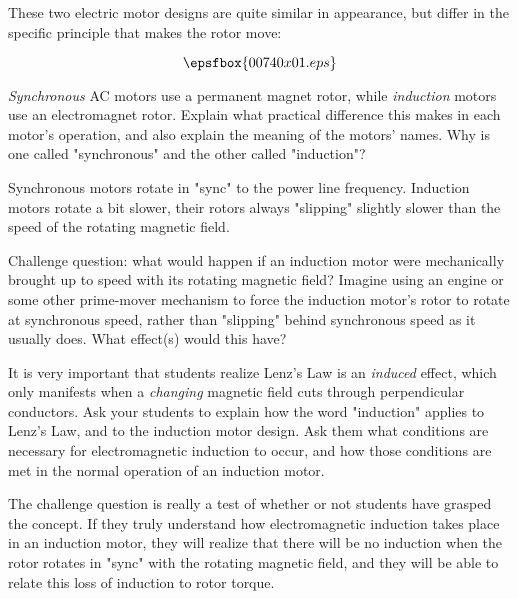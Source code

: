 

These two electric motor designs are quite similar in appearance, but differ in the specific principle that makes the rotor move:

$$\epsfbox{00740x01.eps}$$

{\it Synchronous} AC motors use a permanent magnet rotor, while {\it induction} motors use an electromagnet rotor.  Explain what practical difference this makes in each motor's operation, and also explain the meaning of the motors' names.  Why is one called "synchronous" and the other called "induction"?







Synchronous motors rotate in "sync" to the power line frequency.  Induction motors rotate a bit slower, their rotors always "slipping" slightly slower than the speed of the rotating magnetic field.

\vskip 10pt

Challenge question: what would happen if an induction motor were mechanically brought up to speed with its rotating magnetic field?  Imagine using an engine or some other prime-mover mechanism to force the induction motor's rotor to rotate at synchronous speed, rather than "slipping" behind synchronous speed as it usually does.  What effect(s) would this have?







It is very important that students realize Lenz's Law is an {\it induced} effect, which only manifests when a {\it changing} magnetic field cuts through perpendicular conductors.  Ask your students to explain how the word "induction" applies to Lenz's Law, and to the induction motor design.  Ask them what conditions are necessary for electromagnetic induction to occur, and how those conditions are met in the normal operation of an induction motor.

The challenge question is really a test of whether or not students have grasped the concept.  If they truly understand how electromagnetic induction takes place in an induction motor, they will realize that there will be no induction when the rotor rotates in "sync" with the rotating magnetic field, and they will be able to relate this loss of induction to rotor torque.




